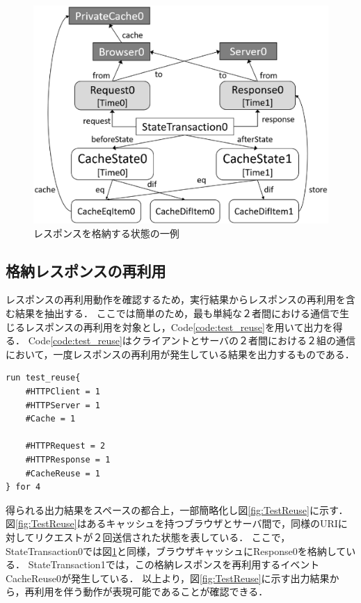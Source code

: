 \documentclass[12pt,a4paper]{jbook}
\begin{document}
\begin{figure}[htb]
\centering
\includegraphics[width=450pt]{./fig/TestStore.eps}
\caption{レスポンスを格納する状態の一例}
\label{fig:TestStore}
\end{figure}

\subsection{格納レスポンスの再利用}
レスポンスの再利用動作を確認するため，実行結果からレスポンスの再利用を含む結果を抽出する．
ここでは簡単のため，最も単純な２者間における通信で生じるレスポンスの再利用を対象とし，Code\ref{code:test_reuse}を用いて出力を得る．
Code\ref{code:test_reuse}はクライアントとサーバの２者間における２組の通信において，一度レスポンスの再利用が発生している結果を出力するものである．

\begin{lstlisting}[caption=格納レスポンスの再利用, label=code:test_reuse]
run test_reuse{
	#HTTPClient = 1
	#HTTPServer = 1
	#Cache = 1

	#HTTPRequest = 2
	#HTTPResponse = 1
	#CacheReuse = 1
} for 4
\end{lstlisting}

得られる出力結果をスペースの都合上，一部簡略化し図\ref{fig:TestReuse}に示す．
図\ref{fig:TestReuse}はあるキャッシュを持つブラウザとサーバ間で，同様のURIに対してリクエストが２回送信された状態を表している．
ここで，StateTransaction0では図\ref{fig:TestStore}と同様，ブラウザキャッシュにResponse0を格納している．
StateTransaction1では，この格納レスポンスを再利用するイベントCacheReuse0が発生している．
以上より，図\ref{fig:TestReuse}に示す出力結果から，再利用を伴う動作が表現可能であることが確認できる．
\end{document}
